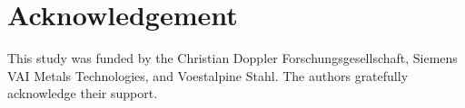 \chapter*{Acknowledgement}
\label{cap:acknowledgement}
This study was funded by the Christian Doppler Forschungsgesellschaft, Siemens
VAI Metals Technologies, and Voestalpine Stahl. The authors gratefully
acknowledge their support.